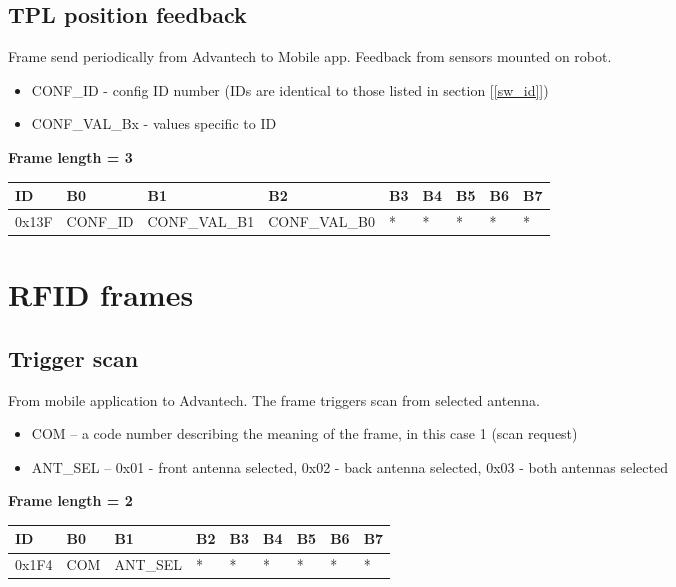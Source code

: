 \documentclass{article}
\begin{document}
\subsection{TPL position feedback}

Frame send periodically from Advantech to Mobile app. Feedback from sensors mounted on robot.

\begin{itemize}
    \item CONF\_ID - config ID number (IDs are identical to those listed in section [\ref{sw_id}])
    \item CONF\_VAL\_Bx - values specific to ID
\end{itemize}{}

\textbf{Frame length = 3}
\begin{center}
    \begin{tabular}{| p{30pt} | p{45pt} | p{70pt} | p{70pt} | p{40pt} | p{40pt} | p{40pt} | p{40pt} | p{40pt} |}
        \hline
        ID    & B0       & B1            & B2            & B3 & B4 & B5 & B6 & B7 \\
        \hline
        0x13F & CONF\_ID & CONF\_VAL\_B1 & CONF\_VAL\_B0 & *  & *  & *  & *  & *  \\
        \hline
    \end{tabular}
\end{center}

\newpage
\section{RFID frames}

\subsection{Trigger scan} \label{trigger_scan}
From mobile application to Advantech. The frame triggers scan from selected antenna.

\begin{itemize}
    \item COM -- a code number describing the meaning of the frame, in this case 1 (scan request)
    \item ANT\_SEL -- 0x01 - front antenna selected, 0x02 - back antenna selected, 0x03 - both antennas selected
\end{itemize}{}

\textbf{Frame length = 2}
\begin{center}
    \begin{tabular}{| p{20pt} | p{40pt} | p{55pt} | p{55pt} | p{40pt} | p{40pt} | p{40pt} | p{40pt} | p{40pt} |}
        \hline
        ID    & B0  & B1       & B2 & B3 & B4 & B5 & B6 & B7 \\
        \hline
        0x1F4 & COM & ANT\_SEL & *  & *  & *  & *  & *  & *  \\
        \hline
    \end{tabular}
\end{center}
\end{document}
